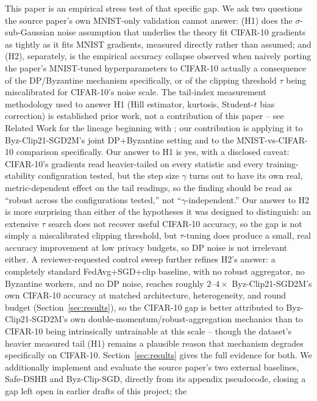 \documentclass{article}
\begin{document}
This paper is an empirical stress test of that specific gap. We ask two
questions the source paper's own MNIST-only validation cannot answer: (H1) does
the $\sigma$-sub-Gaussian noise assumption that underlies the theory fit CIFAR-10
gradients as tightly as it fits MNIST gradients, measured directly rather than
assumed; and (H2), separately, is the empirical accuracy collapse observed when
naively porting the paper's MNIST-tuned hyperparameters to CIFAR-10 actually a
consequence of the DP/Byzantine mechanism specifically, or of the clipping
threshold $\tau$ being miscalibrated for CIFAR-10's noise scale. The tail-index
measurement methodology used to answer H1 (Hill estimator, kurtosis, Student-$t$
bias correction) is established prior work, not a contribution of this paper --
see Related Work for the lineage beginning with \citet{simsekli2019tailindex};
our contribution is applying it to Byz-Clip21-SGD2M's joint DP+Byzantine setting
and to the MNIST-vs-CIFAR-10 comparison specifically. Our answer to
H1 is yes, with a disclosed caveat: CIFAR-10's gradients read heavier-tailed on
every statistic and every training-stability configuration tested, but the step
size $\gamma$ turns out to have its own real, metric-dependent effect on the
tail readings, so the finding should be read as ``robust across the
configurations tested,'' not ``$\gamma$-independent.'' Our answer to H2 is
more surprising than either of the hypotheses it was designed to distinguish:
an extensive $\tau$ search does not recover useful CIFAR-10 accuracy, so the
gap is not simply a miscalibrated clipping threshold, but $\tau$-tuning does
produce a small, real accuracy improvement at low privacy budgets, so DP noise
is not irrelevant either. A reviewer-requested control sweep further refines
H2's answer: a completely standard FedAvg+SGD+clip baseline, with no robust
aggregator, no Byzantine workers, and no DP noise, reaches roughly $2$--$4\times$
Byz-Clip21-SGD2M's own CIFAR-10 accuracy at matched architecture, heterogeneity,
and round budget (Section~\ref{sec:results}), so the CIFAR-10 gap is better
attributed to Byz-Clip21-SGD2M's own double-momentum/robust-aggregation
mechanics than to CIFAR-10 being intrinsically untrainable at this scale --
though the dataset's heavier measured tail (H1) remains a plausible reason
that mechanism degrades specifically on CIFAR-10. Section~\ref{sec:results}
gives the full evidence for both. We additionally implement and evaluate the source paper's two
external baselines, Safe-DSHB and Byz-Clip-SGD, directly from its appendix
pseudocode, closing a gap left open in earlier drafts of this project; the
\end{document}
